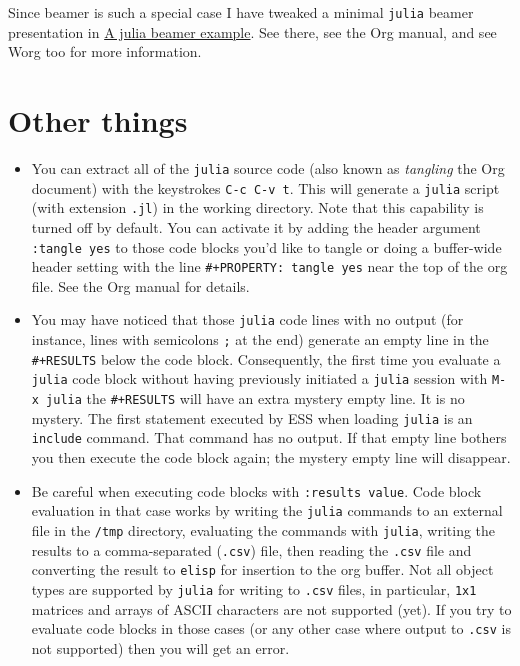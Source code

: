 \documentclass[11pt]{article}
\begin{document}
Since beamer is such a special case I have tweaked a minimal \texttt{julia} beamer presentation in \href{file://ob-julia-beamer.org}{A julia beamer example}.  See there, see the Org manual, and see Worg too for more information.
\section[Other things]{Other things}
\label{sec-5}

\begin{itemize}
\item You can extract all of the \texttt{julia} source code (also known as \emph{tangling} the Org document) with the keystrokes \texttt{C-c C-v t}.  This will generate a \texttt{julia} script (with extension \texttt{.jl}) in the working directory.  Note that this capability is turned off by default.  You can activate it by adding the header argument \texttt{:tangle yes} to those code blocks you'd like to tangle or doing a buffer-wide header setting with the line \texttt{\#+PROPERTY: tangle yes} near the top of the org file.  See the Org manual for details.
\item You may have noticed that those \texttt{julia} code lines with no output (for instance, lines with semicolons \texttt{;} at the end) generate an empty line in the \texttt{\#+RESULTS} below the code block.  Consequently, the first time you evaluate a \texttt{julia} code block without having previously initiated a \texttt{julia} session with \texttt{M-x julia} the \texttt{\#+RESULTS} will have an extra mystery empty line.  It is no mystery.  The first statement executed by ESS when loading \texttt{julia} is an \texttt{include} command.  That command has no output.  If that empty line bothers you then execute the code block again; the mystery empty line will disappear.
\item Be careful when executing code blocks with \texttt{:results value}.  Code block evaluation in that case works by writing the \texttt{julia} commands to an external file in the \texttt{/tmp} directory, evaluating the commands with \texttt{julia}, writing the results to a comma-separated (\texttt{.csv}) file, then reading the \texttt{.csv} file and converting the result to \texttt{elisp} for insertion to the org buffer.  Not all object types are supported by \texttt{julia} for writing to \texttt{.csv} files, in particular, \texttt{1x1} matrices and arrays of ASCII characters are not supported (yet).  If you try to evaluate code blocks in those cases (or any other case where output to \texttt{.csv} is not supported) then you will get an error.
\end{itemize}
\end{document}
